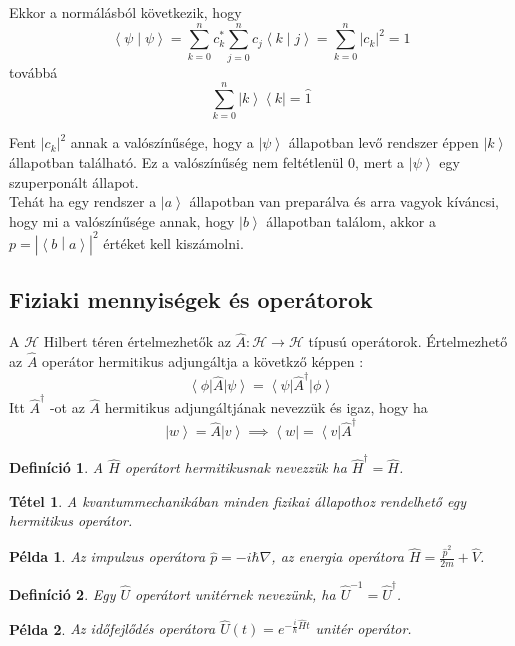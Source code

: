 \documentclass[12pt]{article}
\theoremstyle{plain}
\newcommand{\ket}[1]{\left| #1 \right >}
\newcommand{\bra}[1]{\left < #1 \right |}
\newcommand{\bracket}[2]{\left < #1 \middle | #2 \right>}
\newtheorem*{theorem*}{Tétel}
\newtheorem*{def*}{Definíció}
\newtheorem*{pld*}{Példa}
\begin{document}
Ekkor a normálásból következik, hogy 
$$\bracket{\psi}{\psi} = \sum\limits_{k=0}^{n} c_k^* \sum\limits_{j=0}^{n} c_j \bracket{k}{j} =
\sum\limits_{k=0}^{n} |c_k|^2 = 1$$
továbbá
$$\sum\limits_{k=0}^{n} \ket k \bra k = \hat{1}$$

Fent $|c_k|^2$ annak a valószínűsége, hogy a $\ket \psi$ állapotban levő rendszer éppen $\ket k$ állapotban található.
Ez a valószínűség nem feltétlenül 0, mert a $\ket \psi$ egy szuperponált állapot.
\\ Tehát ha egy rendszer a $\ket a$ állapotban van preparálva és arra vagyok kíváncsi, hogy mi a valószínűsége annak,
hogy $\ket b$ állapotban találom, akkor a $p = |\bracket{b}{a}|^2$ értéket kell kiszámolni.
\subsection{Fiziaki mennyiségek és operátorok}
A $\mathcal{H}$ Hilbert téren értelmezhetők az $\hat{A} : \mathcal{H} \rightarrow \mathcal{H}$  típusú operátorok.
Értelmezhető az $\hat{A}$ operátor hermitikus adjungáltja a követkző képpen :
$$\bra \phi \hat{A} \ket \psi = \bra \psi \hat{A}^\dag \ket \phi$$
Itt $\hat{A}^\dag$ -ot az $\hat{A}$ hermitikus adjungáltjának nevezzük és igaz, hogy ha
$$\ket w = \hat{A}\ket v \implies \bra w = \bra v \hat{A}^\dag$$

\begin{def*}
    A $\hat{H}$ operátort hermitikusnak nevezzük ha $\hat H^\dag = \hat H$.
\end{def*}

\begin{theorem*}
    A kvantummechanikában minden fizikai állapothoz rendelhető egy hermitikus operátor.
\end{theorem*}

\begin{pld*}
    Az impulzus operátora $\hat p = -i\hbar \nabla$, az energia operátora $\hat H = \frac{\hat p^2}{2m} + \hat V$.
\end{pld*}

\begin{def*}
    Egy $\hat U$ operátort unitérnek nevezünk, ha $\hat U^{-1} = \hat U ^\dag$.
\end{def*}

\begin{pld*}
    Az időfejlődés operátora $\hat U(t) = e^{-\frac{i}{\hbar}\hat H t}$ unitér operátor.
\end{pld*}
\end{document}
